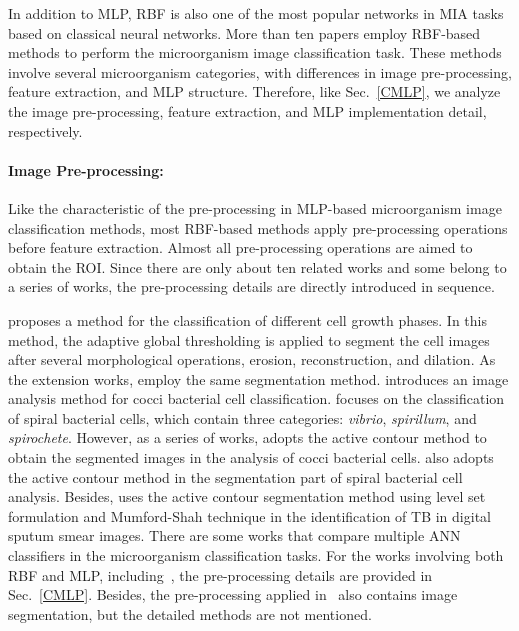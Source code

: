 In addition to MLP, RBF is also one of the most popular networks in MIA tasks based on classical neural networks. More than ten papers employ RBF-based methods to perform the microorganism image classification task. These methods involve several microorganism categories, with differences in image pre-processing, feature extraction, and MLP structure. Therefore, like Sec.~\ref{CMLP}, we analyze the image pre-processing, feature extraction, and MLP implementation detail, respectively.

\paragraph{\textbf{Image Pre-processing:}}
Like the characteristic of the pre-processing in MLP-based microorganism image classification methods, most RBF-based methods apply pre-processing operations before feature extraction. Almost all pre-processing operations are aimed to obtain the ROI. Since there are only about ten related works and some belong to a series of works, the pre-processing details are directly introduced in sequence.

\cite{Hiremath-2010-AICB} proposes a method for the classification of different cell growth phases. In this method, the adaptive global thresholding is applied to segment the cell images after several morphological operations, erosion, reconstruction, and dilation. As the extension works, \cite{Hiremath-2011-ICCB,Hiremath-2011-DMIA} employ the same segmentation method. \cite{Hiremath-2011-ICCB} introduces an image analysis method for cocci bacterial cell classification. \cite{Hiremath-2011-DMIA} focuses on the classification of spiral bacterial cells, which contain three categories: \emph{vibrio}, \emph{spirillum}, and \emph{spirochete}. However, as a series of works, \cite{Hiremath-2010-DIAC} adopts the active contour method to obtain the segmented images in the analysis of cocci bacterial cells. \cite{Hiremath-2012-SBCI} also adopts the active contour method in the segmentation part of spiral bacterial cell analysis. Besides, \cite{Priya-2015-AITO} uses the active contour segmentation method using level set formulation and Mumford-Shah technique in the identification of TB in digital sputum smear images. There are some works that compare multiple ANN classifiers in the microorganism classification tasks. For the works involving both RBF and MLP, including~\cite{Culverhouse-1996-ACFD,Culverhouse-2000-DAMV,Kruk-2015-CCSI}, the pre-processing details are provided in Sec.~\ref{CMLP}. Besides, the pre-processing applied in~\cite{Weller-2007-TSNN} also contains image segmentation, but the detailed methods are not mentioned.

